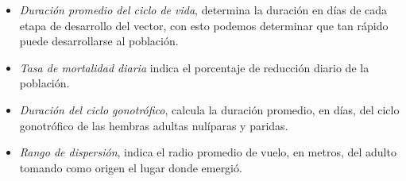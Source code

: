 \begin{itemize}
    \item \textit{Duración promedio del ciclo de vida}, determina la duración en días de cada etapa de desarrollo del vector, con esto podemos determinar que tan rápido puede desarrollarse al población.

    \item \textit{Tasa de mortalidad diaria} indica el porcentaje de reducción diario de la población.

    \item \textit{Duración del ciclo gonotrófico}, calcula la duración promedio, en días, del ciclo gonotrófico de las hembras adultas nulíparas y paridas.

    \item \textit{Rango de dispersión}, indica el radio promedio de vuelo, en metros, del adulto tomando como origen el lugar donde emergió.

\end{itemize}

